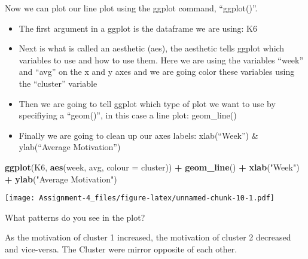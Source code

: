 \documentclass[
]{article}
\newenvironment{Shaded}{\begin{snugshade}}{\end{snugshade}}
\newcommand{\DataTypeTok}[1]{\textcolor[rgb]{0.13,0.29,0.53}{#1}}
\newcommand{\KeywordTok}[1]{\textcolor[rgb]{0.13,0.29,0.53}{\textbf{#1}}}
\newcommand{\NormalTok}[1]{#1}
\newcommand{\OperatorTok}[1]{\textcolor[rgb]{0.81,0.36,0.00}{\textbf{#1}}}
\newcommand{\StringTok}[1]{\textcolor[rgb]{0.31,0.60,0.02}{#1}}
\providecommand{\tightlist}{%
  \setlength{\itemsep}{0pt}\setlength{\parskip}{0pt}}
\begin{document}
\begin{Shaded}
\end{Shaded}

Now we can plot our line plot using the ggplot command, ``ggplot()''.

\begin{itemize}
\tightlist
\item
  The first argument in a ggplot is the dataframe we are using: K6
\item
  Next is what is called an aesthetic (aes), the aesthetic tells ggplot
  which variables to use and how to use them. Here we are using the
  variables ``week'' and ``avg'' on the x and y axes and we are going
  color these variables using the ``cluster'' variable
\item
  Then we are going to tell ggplot which type of plot we want to use by
  specifiying a ``geom()'', in this case a line plot: geom\_line()
\item
  Finally we are going to clean up our axes labels: xlab(``Week'') \&
  ylab(``Average Motivation'')
\end{itemize}

\begin{Shaded}
\begin{Highlighting}[]
\KeywordTok{ggplot}\NormalTok{(K6, }\KeywordTok{aes}\NormalTok{(week, avg, }\DataTypeTok{colour =}\NormalTok{ cluster)) }\OperatorTok{+}\StringTok{ }\KeywordTok{geom_line}\NormalTok{() }\OperatorTok{+}\StringTok{ }\KeywordTok{xlab}\NormalTok{(}\StringTok{"Week"}\NormalTok{) }\OperatorTok{+}\StringTok{ }\KeywordTok{ylab}\NormalTok{(}\StringTok{"Average Motivation"}\NormalTok{)}
\end{Highlighting}
\end{Shaded}

\texttt{[image: Assignment-4\_files/figure-latex/unnamed-chunk-10-1.pdf]}

What patterns do you see in the plot?

As the motivation of cluster 1 increased, the motivation of cluster 2
decreased and vice-versa. The Cluster were mirror opposite of each
other.
\end{document}
